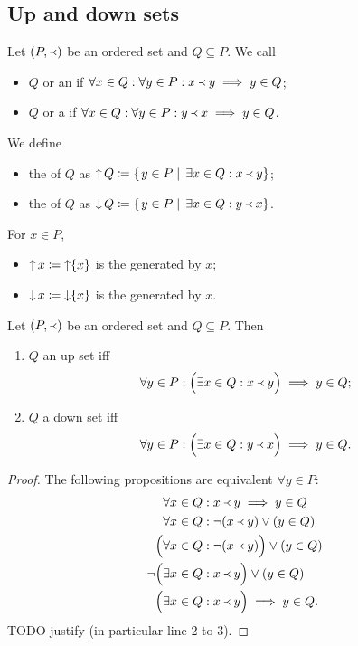 \subsection{Up and down sets}
\begin{definition}
Let $\left( P, \Yleft \right)$ be an ordered set and $Q\subseteq P$. We call
\begin{itemize}
\item $Q$  or an  if $\forall x\in Q: \forall y\in P: x\Yleft y \implies y\in Q$;
\item $Q$  or a  if $\forall x\in Q: \forall y\in P: y\Yleft x \implies y\in Q$.
\end{itemize}
We define
\begin{itemize}
\item the  of $Q$ as $\mathop{\uparrow} Q \coloneqq \left\{\left. y\in P \;\right|\; \exists x\in Q: x\Yleft y \right\}$;
\item the  of $Q$ as $\mathop{\downarrow} Q \coloneqq \left\{\left. y\in P \;\right|\; \exists x\in Q: y\Yleft x \right\}$.
\end{itemize}
For $x\in P$,
\begin{itemize}
\item $\mathop{\uparrow} x \coloneqq \mathop{\uparrow}\{x\}$ is the  generated by $x$;
\item $\mathop{\downarrow} x \coloneqq \mathop{\downarrow}\{x\}$ is the  generated by $x$.
\end{itemize}
\end{definition}


\begin{lemma} \label{definitionUpsetDownset}
Let $\left( P, \Yleft \right)$ be an ordered set and $Q\subseteq P$. Then
\begin{enumerate}
\item $Q$ an up set iff 
\[ \forall y\in P: \Big(\exists x\in Q:  x\Yleft y\Big) \implies y\in Q; \]
\item $Q$ a down set iff 
\[ \forall y\in P: \Big(\exists x\in Q:  y\Yleft x\Big) \implies y\in Q. \]
\end{enumerate}
\end{lemma}
\begin{proof}
The following propositions are equivalent $\forall y\in P$:
\begin{align*}
&\forall x\in Q: x\Yleft y \implies y\in Q \\
&\forall x\in Q: \neg(x\Yleft y) \lor (y\in Q) \\
\Big(&\forall x\in Q: \neg(x\Yleft y)\Big) \lor (y\in Q) \\
\neg \Big(&\exists x\in Q: x\Yleft y \Big) \lor (y\in Q) \\
\Big(&\exists x\in Q:  x\Yleft y\Big) \implies y\in Q.
\end{align*}
TODO justify (in particular line 2 to 3).
\end{proof}

